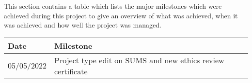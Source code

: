 This section contains a table which lists the major milestones which were
achieved during this project to give an overview of what was achieved, when it was
achieved and how well the project was managed.

{\small\begin{center}
    \begin{tabularx}{\textwidth}{ l  l }
        Date & Milestone \\
        \hline
        05/05/2022 & Project type edit on SUMS and new ethics review certificate \\
    \end{tabularx}
\end{center}}